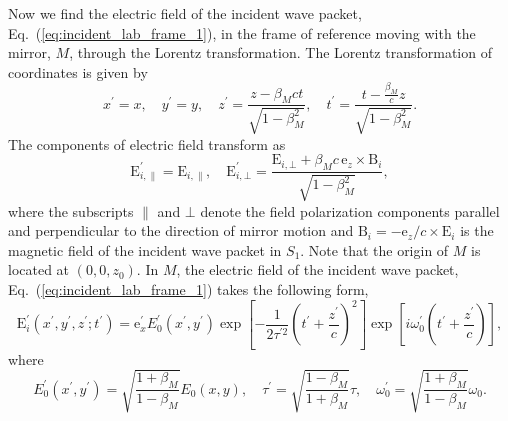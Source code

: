 \documentclass[10pt, a4paper, twoside, openright]{report}
\renewcommand{\vec}[1]{\boldsymbol{\mathrm{#1}}}
\begin{document}
Now we find the electric field of the incident wave packet, Eq.~(\ref{eq:incident_lab_frame_1}), in the frame of reference moving with the mirror, $ M $, through the Lorentz transformation. The Lorentz transformation of coordinates is given by
\begin{equation}\label{eq:lorentz_transform_coords}
x^{\prime} = x, \quad y^{\prime} = y, \quad z^{\prime} = \frac{z - \beta_M c t}{\sqrt{1 - \beta_M^2}}, \quad t^{\prime} = \frac{t - \frac{\beta_M}{c} z}{\sqrt{1 - \beta_M^2}}.
\end{equation}
The components of electric field transform as
\begin{equation}\label{eq:lorentz_transform_fields}
\vec{E}^{\prime}_{i, \parallel} = \vec{E}_{i, \parallel}, \quad \vec{E}^{\prime}_{i, \bot} = \frac{\vec{E}_{i, \bot} + \beta_M c \, \vec{e}_z \times \vec{B}_{i}}{\sqrt{1 - \beta_M^2}},
\end{equation}
where the subscripts $ \parallel $ and $ \bot $ denote the field polarization components parallel and perpendicular to the direction of mirror motion and $ \vec{B}_{i} = -\vec{e}_z / c \times \vec{E}_i $ is the magnetic field of the incident wave packet in $ S_1 $. Note that the origin of $ M $ is located at $ \left( 0, 0, z_0 \right) $. In $ M $, the electric field of the incident wave packet, Eq.~(\ref{eq:incident_lab_frame_1}) takes the following form,
\begin{equation}\label{eq:incident_boost_frame}
\vec{E}^{\prime}_i \left(x^{\prime}, y^{\prime}, z^{\prime}; t^{\prime} \right) = \vec{e}_x^{\prime} E^{\prime}_0 \left(x^{\prime}, y^{\prime} \right) \exp \left[ - \frac{1}{2 \tau^{\prime 2}} \left(t^{\prime} + \frac{z^{\prime}}{c}\right)^2 \right] \exp \left[ i \omega_0^{\prime} \left(t^{\prime} + \frac{z^{\prime}}{c}\right) \right],
\end{equation}
where
\begin{equation}\label{eq:coeff_boost}
E^{\prime}_0 \left(x^{\prime}, y^{\prime} \right) = \sqrt{\frac{1 + \beta_M}{1 - \beta_M}} E_0 \left(x, y \right), \quad \tau^{\prime} = \sqrt{\frac{1 - \beta_M}{1 + \beta_M}} \tau, \quad \omega_0^{\prime} = \sqrt{\frac{1 + \beta_M}{1 - \beta_M}} \omega_0.
\end{equation}
\end{document}
